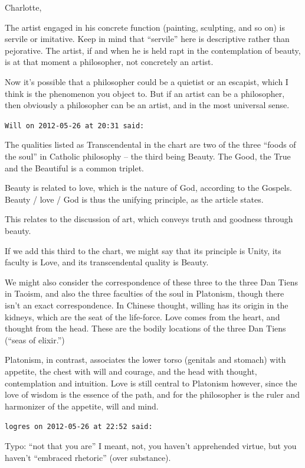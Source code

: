 \begin{footnotesize}
\begin{sffamily}
Charlotte,

The artist engaged in his concrete function (painting, sculpting, and so on) is servile or imitative. Keep in mind that ``servile'' here is descriptive rather than pejorative. The artist, if and when he is held rapt in the contemplation of beauty, is at that moment a philosopher, not concretely an artist.

Now it's possible that a philosopher could be a quietist or an escapist, which I think is the phenomenon you object to. But if an artist can be a philosopher, then obviously a philosopher can be an artist, and in the most universal sense.

\hfill

\texttt{Will on 2012-05-26 at 20:31 said:}

The qualities listed as Transcendental in the chart are two of the three ``foods of the soul'' in Catholic philosophy -- the third being Beauty. The Good, the True and the Beautiful is a common triplet.

Beauty is related to love, which is the nature of God, according to the Gospels. Beauty / love / God is thus the unifying principle, as the article states.

This relates to the discussion of art, which conveys truth and goodness through beauty.

If we add this third to the chart, we might say that its principle is Unity, its faculty is Love, and its transcendental quality is Beauty.

We might also consider the correspondence of these three to the three Dan Tiens in Taoism, and also the three faculties of the soul in Platonism, though there isn't an exact correspondence. In Chinese thought, willing has its origin in the kidneys, which are the seat of the life-force. Love comes from the heart, and thought from the head. These are the bodily locations of the three Dan Tiens (``seas of elixir.'')

Platonism, in contrast, associates the lower torso (genitals and stomach) with appetite, the chest with will and courage, and the head with thought, contemplation and intuition. Love is still central to Platonism however, since the love of wisdom is the essence of the path, and for the philosopher is the ruler and harmonizer of the appetite, will and mind.

\hfill

\texttt{logres on 2012-05-26 at 22:52 said:}

Typo: ``not that you are'' I meant, not, you haven't apprehended virtue, but you haven't ``embraced rhetoric'' (over substance).


\end{sffamily}
\end{footnotesize}
